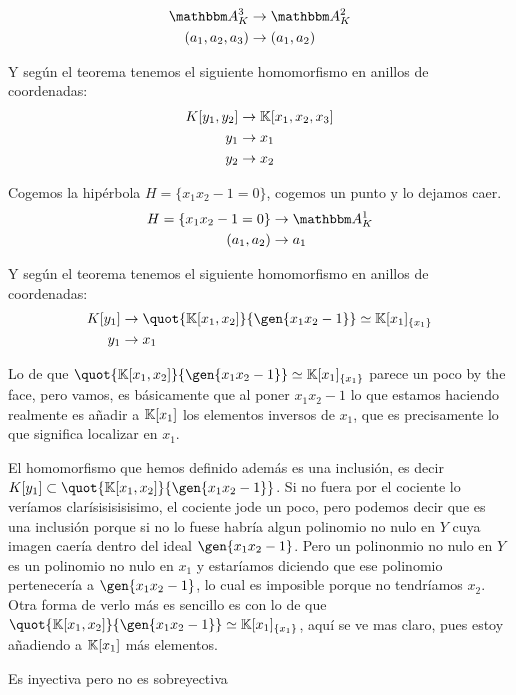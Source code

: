 	\begin{example}
		\begin{align*}
			\A_K^3 & \rightarrow \A_K^2 \\
			(a_1,a_2,a_3) & \rightarrow (a_1,a_2)
		\end{align*}

		Y según el teorema tenemos el siguiente homomorfismo en anillos de coordenadas:
		\begin{align*}
			K[y_1,y_2] & \rightarrow \mathbb{K}[x_1,x_2,x_3] \\
			y_1 & \rightarrow x_1 \\
			y_2 & \rightarrow x_2 \\
		\end{align*}
	\end{example}

	\begin{example}
		Cogemos la hipérbola $H=\{x_1x_2-1=0\}$, cogemos un punto y lo dejamos caer.
		\begin{align*}
			H=\{x_1x_2-1=0\} & \rightarrow \A_K^1 \\
			(a_1,a_2) & \rightarrow a_1
		\end{align*}

		Y según el teorema tenemos el siguiente homomorfismo en anillos de coordenadas:
		\begin{align*}
			K[y_1] & \rightarrow \quot{\K[x_1,x_2]}{\gen{x_1x_2-1}} \simeq \K[x_1]_{\{x_1\}} \\
			y_1 & \rightarrow x_1 \\
		\end{align*}

		Lo de que $\quot{\K[x_1,x_2]}{\gen{x_1x_2-1}} \simeq \K[x_1]_{\{x_1\}}$ parece un poco by the face, pero vamos, es básicamente que al poner $x_1x_2-1$ lo que estamos haciendo realmente es añadir a $\mathbb{K}[x_1]$ los elementos inversos de $x_1$, que es precisamente lo que significa localizar en $x_1$.

		El homomorfismo que hemos definido además es una inclusión, es decir $K[y_1] \subset \quot{\K[x_1,x_2]}{\gen{x_1x_2-1}}$. Si no fuera por el cociente lo veríamos clarísisisisisimo, el cociente jode un poco, pero podemos decir que es una inclusión porque si no lo fuese habría algun polinomio no nulo en $Y$ cuya imagen caería dentro del ideal $\gen{x_1x_2-1}$. Pero un polinonmio no nulo en $Y$ es un polinomio no nulo en $x_1$ y estaríamos diciendo que ese polinomio pertenecería a $\gen{x_1x_2-1}$, lo cual es imposible porque no tendríamos $x_2$.  Otra forma de verlo más es sencillo es con lo de que $\quot{\K[x_1,x_2]}{\gen{x_1x_2-1}} \simeq \K[x_1]_{\{x_1\}}$, aquí se ve mas claro, pues estoy añadiendo a $\mathbb{K}[x_1]$ más elementos.

		Es inyectiva pero no es sobreyectiva %
	\end{example}

